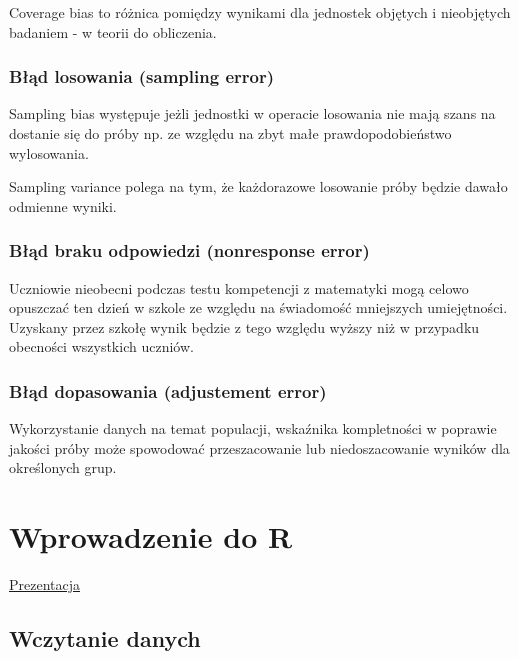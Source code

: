 \documentclass[
]{book}
\begin{document}
Coverage bias to różnica pomiędzy wynikami dla jednostek objętych i nieobjętych badaniem - w teorii do obliczenia.

\hypertarget{bux142ux105d-losowania-sampling-error}{%
\subsection{Błąd losowania (sampling error)}\label{bux142ux105d-losowania-sampling-error}}

Sampling bias występuje jeżli jednostki w operacie losowania nie mają szans na dostanie się do próby np. ze względu na zbyt małe prawdopodobieństwo wylosowania.

Sampling variance polega na tym, że każdorazowe losowanie próby będzie dawało odmienne wyniki.

\hypertarget{bux142ux105d-braku-odpowiedzi-nonresponse-error}{%
\subsection{Błąd braku odpowiedzi (nonresponse error)}\label{bux142ux105d-braku-odpowiedzi-nonresponse-error}}

Uczniowie nieobecni podczas testu kompetencji z matematyki mogą celowo opuszczać ten dzień w szkole ze względu na świadomość mniejszych umiejętności. Uzyskany przez szkołę wynik będzie z tego względu wyższy niż w przypadku obecności wszystkich uczniów.

\hypertarget{bux142ux105d-dopasowania-adjustement-error}{%
\subsection{Błąd dopasowania (adjustement error)}\label{bux142ux105d-dopasowania-adjustement-error}}

Wykorzystanie danych na temat populacji, wskaźnika kompletności w poprawie jakości próby może spowodować przeszacowanie lub niedoszacowanie wyników dla określonych grup.

\hypertarget{wprowadzenie-do-r}{%
\chapter{Wprowadzenie do R}\label{wprowadzenie-do-r}}

\href{presentations/02_wprowadzenieR.html}{Prezentacja}

\hypertarget{wczytanie-danych}{%
\section{Wczytanie danych}\label{wczytanie-danych}}
\end{document}
